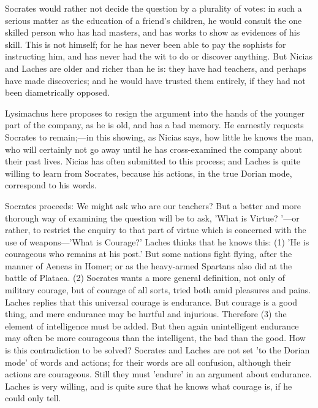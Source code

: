 \documentclass[11pt,letter]{article}
\begin{document}
\par  Socrates would rather not decide the question by a plurality of votes: in such a serious matter as the education of a friend's children, he would consult the one skilled person who has had masters, and has works to show as evidences of his skill. This is not himself; for he has never been able to pay the sophists for instructing him, and has never had the wit to do or discover anything. But Nicias and Laches are older and richer than he is: they have had teachers, and perhaps have made discoveries; and he would have trusted them entirely, if they had not been diametrically opposed.

\par  Lysimachus here proposes to resign the argument into the hands of the younger part of the company, as he is old, and has a bad memory. He earnestly requests Socrates to remain;—in this showing, as Nicias says, how little he knows the man, who will certainly not go away until he has cross-examined the company about their past lives. Nicias has often submitted to this process; and Laches is quite willing to learn from Socrates, because his actions, in the true Dorian mode, correspond to his words.

\par  Socrates proceeds: We might ask who are our teachers? But a better and more thorough way of examining the question will be to ask, 'What is Virtue? '—or rather, to restrict the enquiry to that part of virtue which is concerned with the use of weapons—'What is Courage?' Laches thinks that he knows this: (1) 'He is courageous who remains at his post.' But some nations fight flying, after the manner of Aeneas in Homer; or as the heavy-armed Spartans also did at the battle of Plataea. (2) Socrates wants a more general definition, not only of military courage, but of courage of all sorts, tried both amid pleasures and pains. Laches replies that this universal courage is endurance. But courage is a good thing, and mere endurance may be hurtful and injurious. Therefore (3) the element of intelligence must be added. But then again unintelligent endurance may often be more courageous than the intelligent, the bad than the good. How is this contradiction to be solved? Socrates and Laches are not set 'to the Dorian mode' of words and actions; for their words are all confusion, although their actions are courageous. Still they must 'endure' in an argument about endurance. Laches is very willing, and is quite sure that he knows what courage is, if he could only tell.
\end{document}

